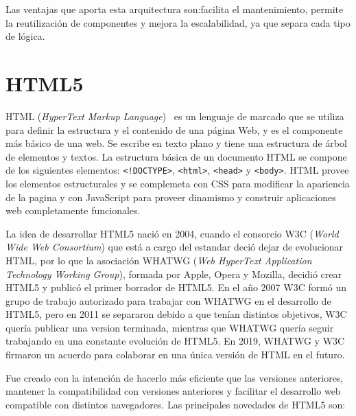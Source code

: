 \documentclass[a4paper, 12pt]{book}
\begin{document}
Las ventajas que aporta esta arquitectura son:facilita el mantenimiento, permite la reutilización de componentes y mejora la escalabilidad, ya que separa cada tipo de lógica.


\section{HTML5} 
\label{sec:HTML5}

HTML (\emph{HyperText Markup Language})~\cite{Pagina_HTML, Historia_HTML5, gauchat2012gran} es un lenguaje de marcado que se utiliza para definir la estructura y el contenido de una página Web, y es el componente más básico de una web. 
Se escribe en texto plano y tiene una estructura de árbol de elementos y textos. 
La estructura básica de un documento HTML se compone de los siguientes elementos: \texttt{<!DOCTYPE>}, \texttt{<html>}, \texttt{<head>} y \texttt{<body>}. 
HTML provee los elementos estructurales y se complemeta con CSS para modificar la apariencia de la pagina y con JavaScript para proveer dinamismo y construir aplicaciones web completamente funcionales. 

La idea de desarrollar HTML5 nació en 2004, cuando el consorcio W3C (\emph{World Wide Web Consortium})  que está a cargo del estandar deció dejar de evolucionar HTML, por lo que la asociación WHATWG (\emph{Web HyperText Application Technology Working Group}), formada por Apple, Opera y Mozilla, decidió crear HTML5 y publicó el primer borrador de HTML5. 
En el año 2007 W3C formó un grupo de trabajo autorizado para trabajar con WHATWG en el desarrollo de HTML5, pero en 2011 se separaron debido a que tenían distintos objetivos, W3C quería publicar una version terminada, mientras que WHATWG quería seguir trabajando en una constante evolución de HTML5. 
En 2019, WHATWG y W3C firmaron un acuerdo para colaborar en una única versión de HTML en el futuro.

Fue creado con la intención de hacerlo más eficiente que las versiones anteriores, mantener la compatibilidad con versiones anteriores y facilitar el desarrollo web compatible con distintos navegadores. Las principales novedades de HTML5 son:
\end{document}
